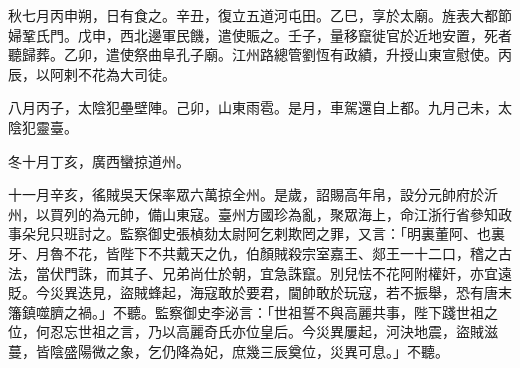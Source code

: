 \begin{pinyinscope}
 秋七月丙申朔，日有食之。辛丑，復立五道河屯田。乙巳，享於太廟。旌表大都節婦鞏氏門。戊申，西北邊軍民饑，遣使賑之。壬子，量移竄徙官於近地安置，死者聽歸葬。乙卯，遣使祭曲阜孔子廟。江州路總管劉恆有政績，升授山東宣慰使。丙辰，以阿剌不花為大司徒。



 八月丙子，太陰犯壘壁陣。己卯，山東雨雹。是月，車駕還自上都。九月己未，太陰犯靈臺。



 冬十月丁亥，廣西蠻掠道州。



 十一月辛亥，徭賊吳天保率眾六萬掠全州。是歲，詔賜高年帛，設分元帥府於沂州，以買列的為元帥，備山東寇。臺州方國珍為亂，聚眾海上，命江浙行省參知政事朵兒只班討之。監察御史張楨劾太尉阿乞剌欺罔之罪，又言：「明裏董阿、也裏牙、月魯不花，皆陛下不共戴天之仇，伯顏賊殺宗室嘉王、郯王一十二口，稽之古法，當伏門誅，而其子、兄弟尚仕於朝，宜急誅竄。別兒怯不花阿附權奸，亦宜遠貶。今災異迭見，盜賊蜂起，海寇敢於要君，閫帥敢於玩寇，若不振舉，恐有唐末籓鎮噬臍之禍。」不聽。監察御史李泌言：「世祖誓不與高麗共事，陛下踐世祖之位，何忍忘世祖之言，乃以高麗奇氏亦位皇后。今災異屢起，河決地震，盜賊滋蔓，皆陰盛陽微之象，乞仍降為妃，庶幾三辰奠位，災異可息。」不聽。



\end{pinyinscope}